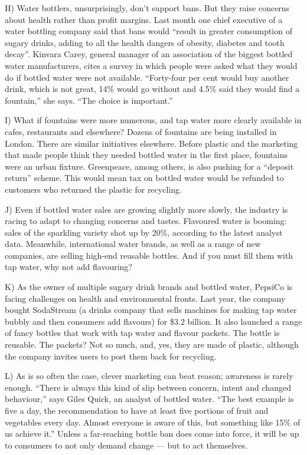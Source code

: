 \documentclass[UTF8,11pt]{ctexart}
\begin{document}
H) Water bottlers, unsurprisingly, don’t support bans. But they raise concerns about health rather than profit margins. Last month one chief executive of a water bottling company said that bans would “result in greater consumption of sugary drinks, adding to all the health dangers of obesity, diabetes and tooth decay”. Kinvara Carey, general manager of an association of the biggest bottled water manufacturers, cites a survey in which people were asked what they would do if bottled water were not available. “Forty-four per cent would buy another drink, which is not great, 14\% would go without and 4.5\% said they would find a fountain,” she says. “The choice is important.”


I) What if fountains were more numerous, and tap water more clearly available in cafes, restaurants and elsewhere? Dozens of fountains are being installed in London. There are similar initiatives elsewhere. Before plastic and the marketing that made people think they needed bottled water in the first place, fountains were an urban fixture. Greenpeace, among others, is also pushing for a “deposit return” scheme. This would mean tax on bottled water would be refunded to customers who returned the plastic for recycling.


J) Even if bottled water sales are growing slightly more slowly, the industry is racing to adapt to changing concerns and tastes. Flavoured water is booming: sales of the sparkling variety shot up by 20\%, according to the latest analyst data. Meanwhile, international water brands, as well as a range of new companies, are selling high-end reusable bottles. And if you must fill them with tap water, why not add flavouring?


K) As the owner of multiple sugary drink brands and bottled water, PepsiCo is facing challenges on health and environmental fronts. Last year, the company bought SodaStream (a drinks company that sells machines for making tap water bubbly and then consumers add flavours) for \$3.2 billion. It also launched a range of fancy bottles that work with tap water and flavour packets. The bottle is reusable. The packets? Not so much, and, yes, they are made of plastic, although the company invites users to post them back for recycling.


L) As is so often the case, clever marketing can beat reason; awareness is rarely enough. “There is always this kind of slip between concern, intent and changed behaviour,” says Giles Quick, an analyst of bottled water. “The best example is five a day, the recommendation to have at least five portions of fruit and vegetables every day. Almost everyone is aware of this, but something like 15\% of us achieve it.” Unless a far-reaching bottle ban does come into force, it will be up to consumers to not only demand change — but to act themselves.
\end{document}
